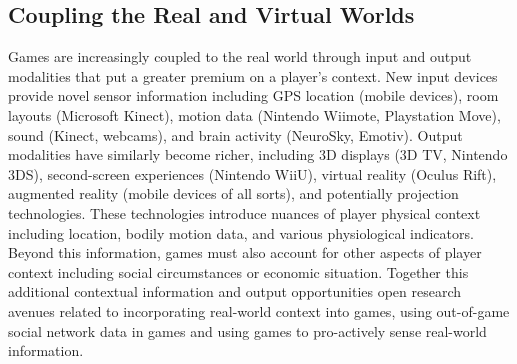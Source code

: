 \documentclass[conference]{IEEEtran}
\newcounter{questionno}
\newcommand{\subsubsectionx}[1]{{\em {\arabic{questionno}) #1}}
	\addtocounter{questionno}{1}
	}
\begin{document}
%


\subsection{Coupling the Real and Virtual Worlds}

Games are increasingly coupled to the real world through input and output modalities that put a greater premium on a player's context. New input devices provide novel sensor information including GPS location (mobile devices), room layouts (Microsoft Kinect), motion data (Nintendo Wiimote, Playstation Move), sound (Kinect, webcams), and brain activity (NeuroSky, Emotiv). 
Output modalities have similarly become richer, including 3D displays (3D TV, Nintendo 3DS), second-screen experiences (Nintendo WiiU), virtual reality (Oculus Rift), augmented reality (mobile devices of all sorts), and potentially projection technologies. 
These technologies introduce nuances of player physical context including location, bodily motion data, and various physiological indicators. 
Beyond this information, games must also account for other aspects of player context including social circumstances or economic situation. Together this additional contextual information and output opportunities open research avenues related to incorporating real-world context into games, using out-of-game social network data in games and using games to pro-actively sense real-world information.
\end{document}
